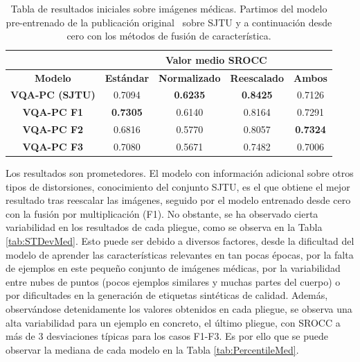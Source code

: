 \begin{table}[htp]
  \scriptsize
  \centering
\begin{tabular}{|c|cccc|}
\hline
\rowcolor[HTML]{FFC702}
                       & \multicolumn{4}{c|}{\textbf{Valor medio SROCC}}                                                                                                    \\ \hline
\rowcolor[HTML]{FFC702}
\textbf{Modelo}        & \multicolumn{1}{c|}{\textbf{Estándar}} & \multicolumn{1}{c|}{\textbf{Normalizado}} & \multicolumn{1}{c|}{\textbf{Reescalado}} & \textbf{Ambos}  \\ \hline
\textbf{VQA-PC (SJTU)} & \multicolumn{1}{c|}{0.7094}            & \multicolumn{1}{c|}{\textbf{0.6235}}      & \multicolumn{1}{c|}{\textbf{0.8425}}    & 0.7126          \\ \hline
\textbf{VQA-PC F1}     & \multicolumn{1}{c|}{\textbf{0.7305}}   & \multicolumn{1}{c|}{0.6140}               & \multicolumn{1}{c|}{0.8164}             & 0.7291          \\ \hline
\textbf{VQA-PC F2}     & \multicolumn{1}{c|}{0.6816}            & \multicolumn{1}{c|}{0.5770}               & \multicolumn{1}{c|}{0.8057}             & \textbf{0.7324} \\ \hline
\textbf{VQA-PC F3}     & \multicolumn{1}{c|}{0.7080}            & \multicolumn{1}{c|}{0.5671}      & \multicolumn{1}{c|}{0.7482}             & 0.7006          \\ \hline
\end{tabular}
\caption[Valor medio sobre imágenes médicas.]{Tabla de resultados iniciales sobre imágenes médicas. 
Partimos del modelo pre-entrenado de la publicación original~\cite{VQA-PC} sobre SJTU y 
a continuación desde cero con los métodos de fusión de característica.
}
\label{tab:SroccMedRes}
\end{table}

Los resultados son prometedores. El modelo con información adicional sobre otros 
tipos de distorsiones, conocimiento del conjunto SJTU, es el que obtiene el mejor 
resultado tras reescalar las imágenes, seguido por el modelo entrenado desde cero 
con la fusión por multiplicación (F1). No obstante, se ha observado cierta 
variabilidad en los resultados de cada pliegue, como se observa en la Tabla \ref{tab:STDevMed}.
Esto puede ser debido a diversos factores, desde la dificultad del modelo de 
aprender las características relevantes en tan pocas épocas, por la falta 
de ejemplos en este pequeño conjunto de imágenes médicas, por la variabilidad 
entre nubes de puntos (pocos ejemplos similares y muchas partes del cuerpo) 
o por dificultades en la generación de etiquetas sintéticas de calidad. 
Además, observándose detenidamente los valores obtenidos en cada pliegue, 
se observa una alta variabilidad para un ejemplo en concreto, el último pliegue, 
con SROCC a más de 3 desviaciones típicas para los casos F1-F3.  Es por ello
que se puede observar la mediana de cada modelo en la Tabla \ref{tab:PercentileMed}.

